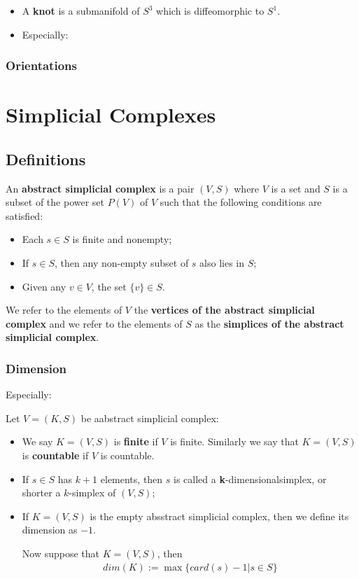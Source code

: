 \documentclass[Total.tex]{subfiles}
\begin{document}
			\begin{Def}
				\begin{itemize}
					\item A \textbf{knot} is a submanifold of $S^3$ which is diffeomorphic to $S^1$.
					
					\item Especially:
				\end{itemize}
			\end{Def}
			
			\subsection{Orientations}
			
	\chapter{Simplicial Complexes}
		\section{Definitions}
			\begin{Def}
				An \textbf{abstract simplicial complex} is a pair $(V,S)$ where $V$ is a set and $S$ is a subset of the power set $P(V)$ of $V$ such that the following conditions are satisfied:
				\begin{itemize}
					\item Each $s\in S$ is finite and nonempty;
					\item If $s\in S$, then any non-empty subset of $s$ also lies in $S$;
					\item Given any $v\in V$, the set $\{v\}\in S$.
				\end{itemize} 
				We refer to the elements of $V$ the \textbf{vertices of the abstract simplicial complex} and we refer to the elements of $S$ as the \textbf{simplices of the abstract simplicial complex}.
			\end{Def}
			\subsection{Dimension}
			Especially:
			\begin{Def}
				Let $V=(K,S)$ be aabstract simplicial complex:
				\begin{itemize}
					\item We say $K=(V,S)$ is \textbf{finite} if $V$ is finite. Similarly we say that $K=(V,S)$ is \textbf{countable} if $V$ is countable.
					\item If $s\in S$ has $k+1$ elements, then $s$ is called a \textbf{k}-dimensionalsimplex, or shorter a $k$-simplex of $(V,S)$;
					\item If $K=(V,S)$ is the empty absstract simplicial complex, then we define its dimension as $-1$.
					
					Now suppose that $K=(V,S)$, then
					\begin{gather*}
						dim(K):=\max\{card(s)-1|s\in S\}
					\end{gather*}
				\end{itemize}
			\end{Def}
\end{document}
